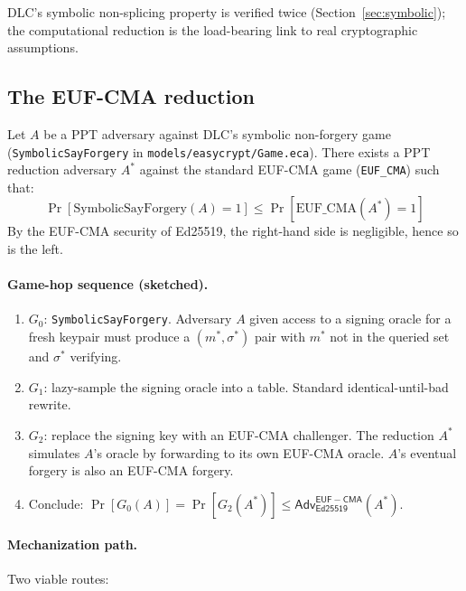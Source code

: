 
DLC's symbolic non-splicing property is verified twice
(Section~\ref{sec:symbolic}); the computational reduction is the
load-bearing link to real cryptographic assumptions.

\subsection{The EUF-CMA reduction}

\begin{theorem}
Let $A$ be a PPT adversary against DLC's symbolic non-forgery game
(\texttt{SymbolicSayForgery} in \texttt{models/easycrypt/Game.eca}).
There exists a PPT reduction adversary $A^*$ against the standard
EUF-CMA game (\texttt{EUF\_CMA}) such that:
\[
\Pr[\text{SymbolicSayForgery}(A) = 1] \leq \Pr[\text{EUF\_CMA}(A^*) = 1]
\]
By the EUF-CMA security of Ed25519, the right-hand side is
negligible, hence so is the left.
\end{theorem}

\paragraph{Game-hop sequence (sketched).}
\begin{enumerate}
\item $G_0$: \texttt{SymbolicSayForgery}.  Adversary $A$ given access to
  a signing oracle for a fresh keypair must produce a $(m^*, \sigma^*)$
  pair with $m^*$ not in the queried set and $\sigma^*$ verifying.
\item $G_1$: lazy-sample the signing oracle into a table.  Standard
  identical-until-bad rewrite.
\item $G_2$: replace the signing key with an EUF-CMA challenger.
  The reduction $A^*$ simulates $A$'s oracle by forwarding to its own
  EUF-CMA oracle.  $A$'s eventual forgery is also an EUF-CMA
  forgery.
\item Conclude: $\Pr[G_0(A)] = \Pr[G_2(A^*)] \leq \mathsf{Adv}^{\mathsf{EUF-CMA}}_{\mathsf{Ed25519}}(A^*)$.
\end{enumerate}

\paragraph{Mechanization path.}
Two viable routes:

